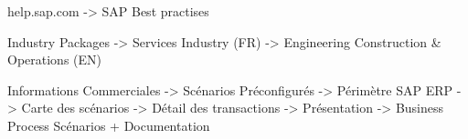 help.sap.com -> SAP Best practises

Industry Packages -> Services Industry (FR)
		  -> Engineering Construction & Operations (EN)

Informations Commerciales -> Scénarios Préconfigurés
			  -> Périmètre SAP ERP
			  -> Carte des scénarios
                          -> Détail des transactions
				-> Présentation
				-> Business Process
Scénarios + Documentation
